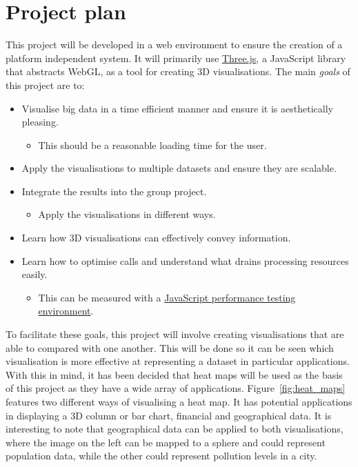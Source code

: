 \documentclass[a4paper]{article}
\begin{document}
	\section{Project plan} {
	\label{sec:project_plan}
		
		This project will be developed in a web environment to ensure the creation of a platform independent system. It will primarily use \href{http://threejs.org/}{Three.js}, a JavaScript library that abstracts WebGL, as a tool for creating 3D visualisations. The main \emph{goals} of this project are to:
		
		\begin{itemize}
			\item Visualise big data in a time efficient manner and ensure it is aesthetically pleasing. 
			\begin{itemize}
				\item This should be a reasonable loading time for the user.
			\end{itemize}
			\item Apply the visualisations to multiple datasets and ensure they are scalable. 
			\item Integrate the results into the group project.
			\begin{itemize}
				\item Apply the visualisations in different ways.
			\end{itemize}
			\item Learn how 3D visualisations can effectively convey information.
			\item Learn how to optimise calls and understand what drains processing resources easily.
			\begin{itemize}
				\item This can be measured with a \href{http://jsperf.com/}{JavaScript performance testing environment}.
			\end{itemize}
		\end{itemize}
		
		To facilitate these goals, this project will involve creating visualisations that are able to compared with one another. This will be done so it can be seen which visualisation is more effective at representing a dataset in particular applications. With this in mind, it has been decided that heat maps will be used as the basis of this project as they have a wide array of applications. Figure~\ref{fig:heat_maps} features two different ways of visualising a heat map. It has potential applications in displaying a 3D column or bar chart, financial and geographical data. It is interesting to note that geographical data can be applied to both visualisations, where the image on the left can be mapped to a sphere and could represent population data, while the other could represent pollution levels in a city.
		
}
\end{document}
